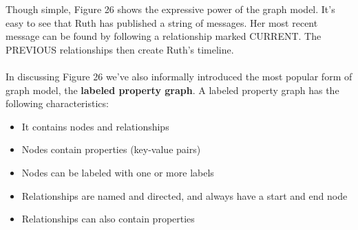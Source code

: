 \documentclass[10pt,a4paper]{article}
\newcommand{\nline}{\\~\\}
\begin{document}
Though simple, Figure 26 shows the expressive power of the graph model. It’s easy to see that Ruth has published a string of messages. Her most recent message can be found by following a relationship marked CURRENT. The PREVIOUS relationships then create Ruth’s timeline. \nline
In discussing Figure 26 we’ve also informally introduced the most popular form of graph model, the \textbf{labeled property graph}. A labeled property graph has the following characteristics:
\begin{itemize}
	\item It contains nodes and relationships
	\item Nodes contain properties (key-value pairs)
	\item Nodes can be labeled with one or more labels
	\item Relationships are named and directed, and always have a start and end node
	\item Relationships can also contain properties
\end{itemize}
\end{document}
